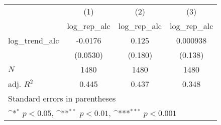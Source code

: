 {
\def\sym#1{\ifmmode^{#1}\else\(^{#1}\)\fi}
\begin{tabular}{l*{3}{c}}
\hline\hline
            &\multicolumn{1}{c}{(1)}&\multicolumn{1}{c}{(2)}&\multicolumn{1}{c}{(3)}\\
            &\multicolumn{1}{c}{log\_rep\_alc}&\multicolumn{1}{c}{log\_rep\_alc}&\multicolumn{1}{c}{log\_rep\_alc}\\
\hline
log\_trend\_alc&     -0.0176         &       0.125         &    0.000938         \\
            &    (0.0530)         &     (0.180)         &     (0.138)         \\
\hline
\(N\)       &        1480         &        1480         &        1480         \\
adj. \(R^{2}\)&       0.445         &       0.437         &       0.348         \\
\hline\hline
\multicolumn{4}{l}{\footnotesize Standard errors in parentheses}\\
\multicolumn{4}{l}{\footnotesize \sym{*} \(p<0.05\), \sym{**} \(p<0.01\), \sym{***} \(p<0.001\)}\\
\end{tabular}
}
